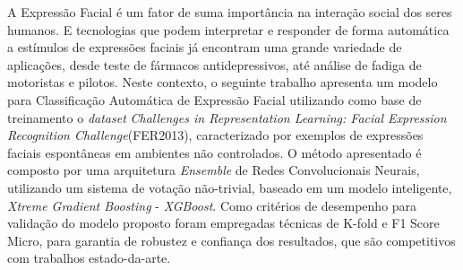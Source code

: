 \begin{resumo}

A Expressão Facial é um fator de suma importância na interação social dos seres humanos. E tecnologias que podem interpretar e responder de forma automática a estímulos de expressões faciais já encontram uma grande variedade de aplicações, desde teste de fármacos antidepressivos, até análise de fadiga de motoristas e pilotos. Neste contexto, o seguinte trabalho apresenta um modelo para Classificação Automática de Expressão Facial utilizando como base de treinamento o \textit{dataset} \textit{Challenges in Representation Learning: Facial Expression Recognition Challenge}(FER2013), caracterizado por exemplos de expressões faciais espontâneas em ambientes não controlados.  O método apresentado é composto por uma arquitetura \textit{Ensemble} de Redes Convolucionais Neurais, utilizando um sistema de votação não-trivial, baseado em um modelo inteligente, \textit{Xtreme Gradient Boosting} - \textit{XGBoost}. Como critérios de desempenho para validação do modelo proposto foram empregadas técnicas de K-fold e F1 Score Micro, para garantia de robustez e confiança dos resultados, que são competitivos com trabalhos estado-da-arte.

\end{resumo}
